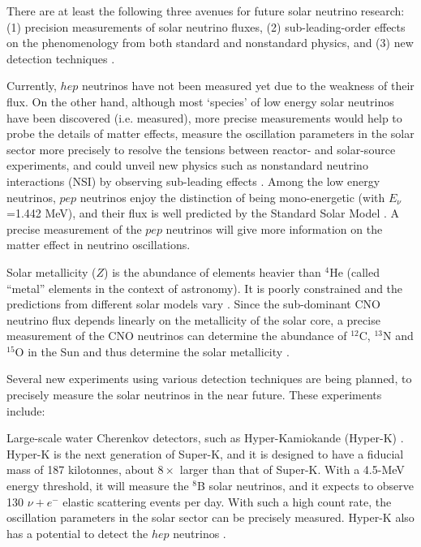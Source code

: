 There are at least the following three avenues for future solar neutrino research: (1) precision measurements of solar neutrino fluxes, (2) sub-leading-order effects on the phenomenology from both standard and nonstandard physics, and (3) new detection techniques \cite{antonio2018state}.

Currently, $hep$ neutrinos have not been measured yet due to the weakness of their flux. On the other hand, although most `species' of low energy solar neutrinos have been discovered (i.e. measured), more precise measurements would help to probe the details of matter effects, measure the oscillation parameters in the solar sector more precisely to resolve the tensions between reactor- and solar-source experiments, and could unveil new physics such as nonstandard neutrino interactions (NSI) by observing sub-leading effects \cite{gann2015everything}. Among the low energy neutrinos, $pep$ neutrinos enjoy the distinction of being mono-energetic (with $E_\nu$=1.442 MeV), and their flux is well predicted by the Standard Solar Model \cite{davini2016cno}. A precise measurement of the $pep$ neutrinos will give more information on the matter effect in neutrino oscillations. 

Solar metallicity ($Z$) is the abundance of elements heavier than $^4$He (called ``metal'' elements in the context of astronomy). It is poorly constrained and the predictions from different solar models vary \cite{vagnozzi2017solar}. Since the sub-dominant CNO neutrino flux depends linearly on the metallicity of the solar core, a precise measurement of the CNO neutrinos can determine the abundance of $^{12}$C, $^{13}$N and $^{15}$O in the Sun and thus determine the solar metallicity \cite{cerdeno2018cno}.

Several new experiments using various detection techniques are being planned, to precisely measure the solar neutrinos in the near future. These experiments include:

Large-scale water Cherenkov detectors, such as Hyper-Kamiokande (Hyper-K) \cite{websiteHyperK}. Hyper-K is the next generation of Super-K, and it is designed to have a fiducial mass of 187 kilotonnes, about $8 \times$ larger than that of Super-K. With a 4.5-MeV energy threshold, it will measure the $^8$B solar neutrinos, and it expects to observe 130 $\nu+e^-$ elastic scattering events per day. With such a high count rate, the oscillation parameters in the solar sector can be precisely measured. Hyper-K also has a potential to detect the $hep$ neutrinos \cite{yano2019solar}. 

